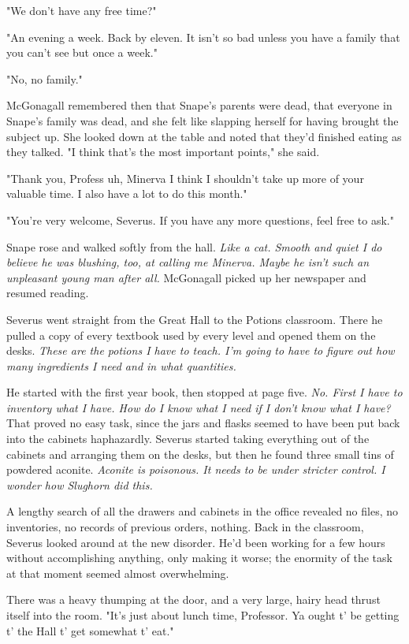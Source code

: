 "We don't have any free time?"

"An evening a week. Back by eleven. It isn't so bad unless you have a family that you can't see but once a week."

"No, no family."

McGonagall remembered then that Snape's parents were dead, that everyone in Snape's family was dead, and she felt like slapping herself for having brought the subject up. She looked down at the table and noted that they'd finished eating as they talked. "I think that's the most important points," she said.

"Thank you, Profess{\el} uh, Minerva{\el} I think I shouldn't take up more of your valuable time. I also have a lot to do this month."

"You're very welcome, Severus. If you have any more questions, feel free to ask."

Snape rose and walked softly from the hall. \emph{Like a cat. Smooth and quiet{\el} I do believe he was blushing, too, at calling me Minerva. Maybe he isn't such an unpleasant young man after all.} McGonagall picked up her newspaper and resumed reading.

Severus went straight from the Great Hall to the Potions classroom. There he pulled a copy of every textbook used by every level and opened them on the desks. \emph{These are the potions I have to teach. I'm going to have to figure out how many ingredients I need and in what quantities.}

He started with the first year book, then stopped at page five. \emph{No. First I have to inventory what I have. How do I know what I need if I don't know what I have?} That proved no easy task, since the jars and flasks seemed to have been put back into the cabinets haphazardly. Severus started taking everything out of the cabinets and arranging them on the desks, but then he found three small tins of powdered aconite. \emph{Aconite is poisonous. It needs to be under stricter control. I wonder how Slughorn did this.}

A lengthy search of all the drawers and cabinets in the office revealed no files, no inventories, no records of previous orders, nothing. Back in the classroom, Severus looked around at the new disorder. He'd been working for a few hours without accomplishing anything, only making it worse; the enormity of the task at that moment seemed almost overwhelming.

There was a heavy thumping at the door, and a very large, hairy head thrust itself into the room. "It's just about lunch time, Professor. Ya ought t' be getting t' the Hall t' get somewhat t' eat."

